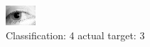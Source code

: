 \begin{figure}[h!]
\begin{center}
\includegraphics[width=0.60\columnwidth]{figures/ID1263_class_4_target_3.png}
\end{center}
\caption{ Classification: 4 actual target: 3}
\label{fig:ID1263_class_4_target_3}
\end{figure}
